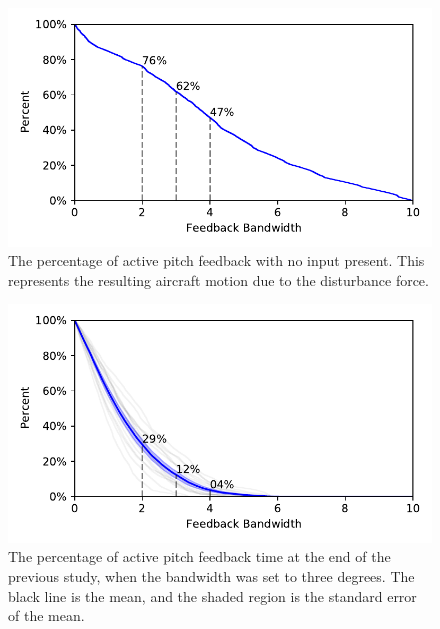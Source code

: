 \begin{figure}[tb!]
    \begin{center}
        \includegraphics[width=\linewidth]{figures/Aircraft/no_input_feedback_on.pdf}
        \caption[The percentage of active pitch feedback with no input present]{The percentage of active pitch feedback with no input present. This represents the resulting aircraft motion due to the disturbance force.}
        \label{figure-aircraft:noinput_pitchfeedback}
    \end{center}
\end{figure}
\begin{figure}[tb!]
    \begin{center}
        \includegraphics[width=\linewidth]{figures/Aircraft/p34_feedback_on.pdf}
        \caption[The percentage of active pitch feedback time at the end of the previous study]{The percentage of active pitch feedback time at the end of the previous study, when the bandwidth was set to three degrees. The black line is the mean, and the shaded region is the standard error of the mean.}
        \label{figure-aircraft:pitchfeedback}
    \end{center}
\end{figure}
